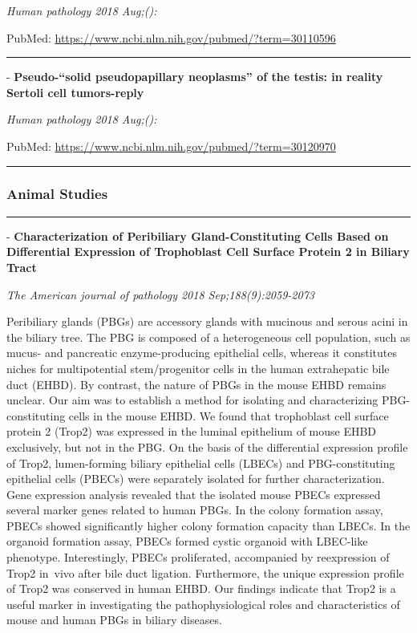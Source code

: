 \documentclass[]{article}
\begin{document}
\emph{Human pathology 2018 Aug;():}

PubMed: \url{https://www.ncbi.nlm.nih.gov/pubmed/?term=30110596}

{}

{}

\begin{center}\rule{0.5\linewidth}{\linethickness}\end{center}

 - \textbf{Pseudo-``solid pseudopapillary neoplasms'' of the testis: in
reality Sertoli cell tumors-reply}

\emph{Human pathology 2018 Aug;():}

PubMed: \url{https://www.ncbi.nlm.nih.gov/pubmed/?term=30120970}

{}

{}

\begin{center}\rule{0.5\linewidth}{\linethickness}\end{center}

\hypertarget{animal-studies}{%
\subsubsection{Animal Studies}\label{animal-studies}}

\begin{center}\rule{0.5\linewidth}{\linethickness}\end{center}

 - \textbf{Characterization of Peribiliary Gland-Constituting Cells
Based on Differential Expression of Trophoblast Cell Surface Protein 2
in Biliary Tract}

\emph{The American journal of pathology 2018 Sep;188(9):2059-2073}

Peribiliary glands (PBGs) are accessory glands with mucinous and serous
acini in the biliary tree. The PBG is composed of a heterogeneous cell
population, such as mucus- and pancreatic enzyme-producing epithelial
cells, whereas it constitutes niches for multipotential stem/progenitor
cells in the human extrahepatic bile duct (EHBD). By contrast, the
nature of PBGs in the mouse EHBD remains unclear. Our aim was to
establish a method for isolating and characterizing PBG-constituting
cells in the mouse EHBD. We found that trophoblast cell surface protein
2 (Trop2) was expressed in the luminal epithelium of mouse EHBD
exclusively, but not in the PBG. On the basis of the differential
expression profile of Trop2, lumen-forming biliary epithelial cells
(LBECs) and PBG-constituting epithelial cells (PBECs) were separately
isolated for further characterization. Gene expression analysis revealed
that the isolated mouse PBECs expressed several marker genes related to
human PBGs. In the colony formation assay, PBECs showed significantly
higher colony formation capacity than LBECs. In the organoid formation
assay, PBECs formed cystic organoid with LBEC-like phenotype.
Interestingly, PBECs proliferated, accompanied by reexpression of Trop2
in~vivo after bile duct ligation. Furthermore, the unique expression
profile of Trop2 was conserved in human EHBD. Our findings indicate that
Trop2 is a useful marker in investigating the pathophysiological roles
and characteristics of mouse and human PBGs in biliary diseases.
\end{document}
